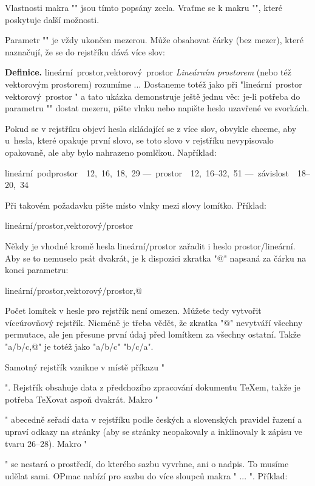 Vlastnosti makra "\iid" jsou tímto popsány zcela. Vraťme se k makru "\ii",
které poskytuje další možnosti.

Parametr "\ii" je vždy ukončen mezerou. Může obsahovat čárky (bez mezer),
které naznačují, že se do rejstříku dává více slov:

\begtt
{\bf Definice.}
\ii lineární~prostor,vektorový~prostor
{\em Lineárním prostorem} (nebo též vektorovým prostorem) rozumíme ...
\endtt
%
Dostaneme totéž jako při "\ii lineární~prostor \ii vektorový~prostor "
a tato ukázka demonstruje ještě jednu věc: je-li potřeba do parametru "\ii"
dostat mezeru, pište vlnku nebo napište heslo uzavřené ve svorkách.

Pokud se v rejstříku objeví hesla skládající se z více slov, obvykle chceme,
aby u~hesla, které opakuje první slovo, se toto slovo 
v rejstříku nevypisovalo opakovaně, ale
aby bylo nahrazeno pomlčkou. Například:
\par\nobreak
\medskip
\hbox{\indent lineární podprostor \ 12, 16, 18, 29}\nobreak
\hbox{\indent \space --- prostor \ 12, 16--32, 51}\nobreak
\hbox{\indent \space --- závislost \ 18--20, 34}
\medskip

\noindent Při takovém požadavku pište místo vlnky mezi slovy lomítko. Příklad:

\begtt
\ii lineární/prostor,vektorový/prostor
\endtt

Někdy je vhodné kromě hesla lineární/prostor zařadit i heslo
prostor/lineární. Aby se to nemuselo psát dvakrát, je k dispozici zkratka
"@" napsaná za čárku na konci parametru:

\begtt
\ii lineární/prostor,vektorový/prostor,@
\endtt

Počet lomítek v hesle pro rejstřík není omezen. Můžete tedy vytvořit
víceúrovňový rejstřík. Nicméně je třeba vědět, že zkratka "@" nevytváří
všechny permutace, ale jen přesune první údaj před lomítkem za všechny
ostatní. Takže "\ii a/b/c,@" je totéž jako "\ii a/b/c" "\ii b/c/a".

Samotný rejstřík vznikne v místě příkazu "\makeindex". Rejstřík obsahuje
data z předchozího zpracování dokumentu \TeX{}em, takže je potřeba
\TeX{}ovat aspoň dvakrát. Makro "\makeindex" abecedně seřadí data v rejstříku
podle českých a slovenských pravidel řazení a upraví odkazy na stránky
(aby se stránky neopakovaly a inklinovaly k zápisu ve tvaru 26--28). Makro
"\makeindex" se nestará o prostředí, do kterého sazbu vyvrhne, ani o nadpis.
To musíme udělat sami. OPmac nabízí pro sazbu do více sloupců makra
" ... \endmulti". Příklad:

